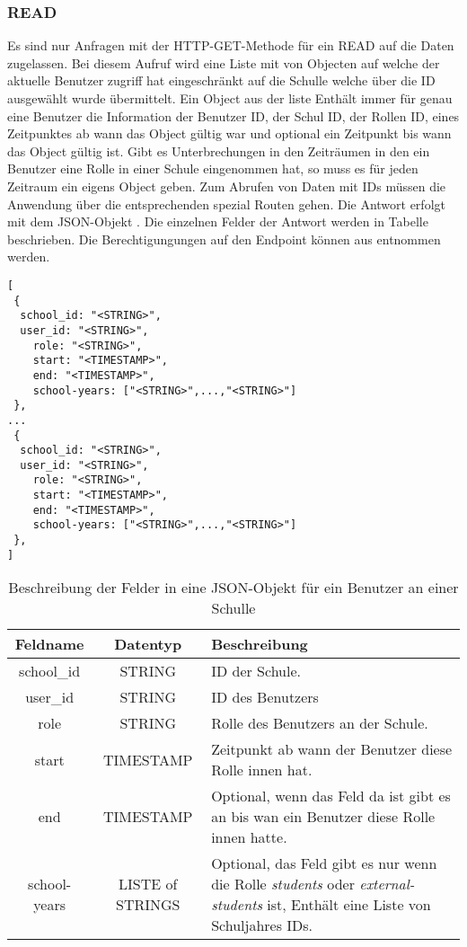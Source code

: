 \subsubsection{READ}
\label{sec:end:rest:api:school-subjects:read}
Es sind nur Anfragen mit der HTTP-GET-Methode für ein READ auf die Daten zugelassen.
Bei diesem Aufruf wird eine Liste mit von Objecten auf welche der aktuelle Benutzer zugriff hat eingeschränkt auf die Schulle welche über die ID ausgewählt wurde übermittelt.
Ein Object aus der liste Enthält immer für genau eine Benutzer die Information der Benutzer ID, der Schul ID, der Rollen ID, eines Zeitpunktes ab wann das Object gültig war und optional ein Zeitpunkt bis wann das Object gültig ist.
Gibt es Unterbrechungen in den Zeiträumen in den ein Benutzer eine Rolle in einer Schule eingenommen hat, so muss es für jeden Zeitraum ein eigens Object geben.
Zum Abrufen von Daten mit IDs müssen die Anwendung über die entsprechenden spezial Routen gehen.
Die Antwort erfolgt mit dem JSON-Objekt . Die einzelnen Felder der Antwort werden in Tabelle  beschrieben.
Die Berechtigungungen auf den Endpoint können aus  entnommen werden.


\begin{lstlisting}[caption={JSON-Antwort für einen GET-Aufruf der Route /api/school/users/\$id},label={lst:code:rest:api:school:users:id:read:ret},frame=tlrb]
[
 {
  school_id: "<STRING>",
  user_id: "<STRING>",
	role: "<STRING>",
	start: "<TIMESTAMP>",
	end: "<TIMESTAMP>",
	school-years: ["<STRING>",...,"<STRING>"]
 },
...
 {
  school_id: "<STRING>",
  user_id: "<STRING>",
	role: "<STRING>",
	start: "<TIMESTAMP>",
	end: "<TIMESTAMP>",
	school-years: ["<STRING>",...,"<STRING>"]
 },
]
\end{lstlisting}

\begin{table}[htb]
	\begin{tabularx}{\textwidth}{|c|c|X|}
		\hline
			\textbf{Feldname} & \textbf{Datentyp} & \textbf{Beschreibung} \\ \hline
			school\_id & STRING & ID der Schule. \\ \hline
			user\_id & STRING & ID des Benutzers \\ \hline
			role & STRING & Rolle des Benutzers an der Schule. \\ \hline
			start & TIMESTAMP & Zeitpunkt ab wann der Benutzer diese Rolle innen hat. \\ \hline
			end & TIMESTAMP & Optional, wenn das Feld da ist gibt es an bis wan ein Benutzer diese Rolle innen hatte. \\ \hline
			school-years & LISTE of STRINGS & Optional, das Feld gibt es nur wenn die Rolle \textit{students} oder \textit{external-students} ist, Enthält eine Liste von Schuljahres IDs. \\ \hline 
	\end{tabularx}

		\caption{Beschreibung der Felder in eine JSON-Objekt für ein Benutzer an einer Schulle}
		\label{tab:rest:api:school:users:id:read:ret:json}
\end{table}


